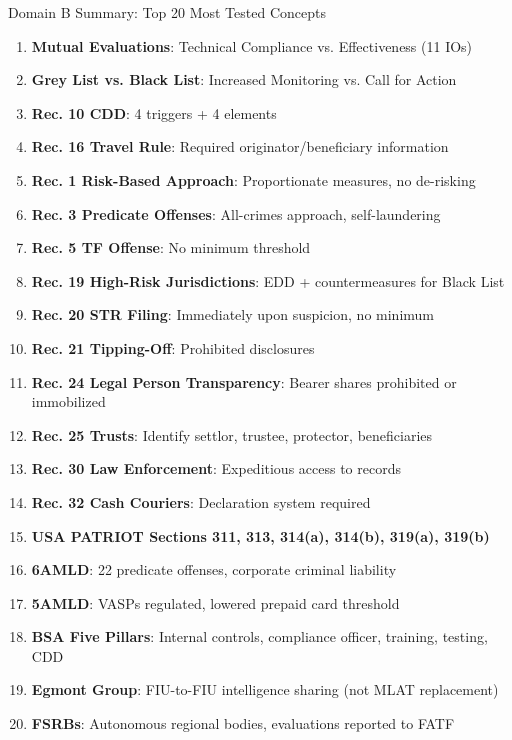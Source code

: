 \documentclass{beamer}
\begin{document}
	\begin{frame}{Domain B Summary: Top 20 Most Tested Concepts}
		\begin{enumerate}
			\item \textbf{Mutual Evaluations}: Technical Compliance vs. Effectiveness (11 IOs)
			\item \textbf{Grey List vs. Black List}: Increased Monitoring vs. Call for Action
			\item \textbf{Rec. 10 CDD}: 4 triggers + 4 elements
			\item \textbf{Rec. 16 Travel Rule}: Required originator/beneficiary information
			\item \textbf{Rec. 1 Risk-Based Approach}: Proportionate measures, no de-risking
			\item \textbf{Rec. 3 Predicate Offenses}: All-crimes approach, self-laundering
			\item \textbf{Rec. 5 TF Offense}: No minimum threshold
			\item \textbf{Rec. 19 High-Risk Jurisdictions}: EDD + countermeasures for Black List
			\item \textbf{Rec. 20 STR Filing}: Immediately upon suspicion, no minimum
			\item \textbf{Rec. 21 Tipping-Off}: Prohibited disclosures
			\item \textbf{Rec. 24 Legal Person Transparency}: Bearer shares prohibited or immobilized
			\item \textbf{Rec. 25 Trusts}: Identify settlor, trustee, protector, beneficiaries
			\item \textbf{Rec. 30 Law Enforcement}: Expeditious access to records
			\item \textbf{Rec. 32 Cash Couriers}: Declaration system required
			\item \textbf{USA PATRIOT Sections 311, 313, 314(a), 314(b), 319(a), 319(b)}
			\item \textbf{6AMLD}: 22 predicate offenses, corporate criminal liability
			\item \textbf{5AMLD}: VASPs regulated, lowered prepaid card threshold
			\item \textbf{BSA Five Pillars}: Internal controls, compliance officer, training, testing, CDD
			\item \textbf{Egmont Group}: FIU-to-FIU intelligence sharing (not MLAT replacement)
			\item \textbf{FSRBs}: Autonomous regional bodies, evaluations reported to FATF
		\end{enumerate}
	\end{frame}
	
\end{document}
